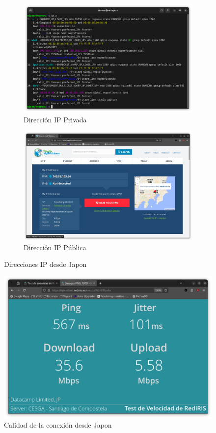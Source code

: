 \begin{figure}[H]
    \centering
    \begin{subfigure}{.5\textwidth}
        \centering
        \includegraphics[width=\linewidth]{IP-Privada-Japon.png}
        \caption{Dirección IP Privada}
    \end{subfigure}%
    \begin{subfigure}{.5\textwidth}
        \centering
        \includegraphics[width=\linewidth]{IP-Publica-Japon.png}
        \caption{Dirección IP Pública}
    \end{subfigure}
    \caption{Direcciones IP desde Japon}
    \label{fig:IPs-Japon}
\end{figure}

\begin{figure}[H]
    \centering
    \includegraphics[width=\linewidth]{CalidadConexion-Japon.png}
    \caption{Calidad de la conexión desde Japon}
    \label{fig:Calidad-Conexión-Japon}
\end{figure}

